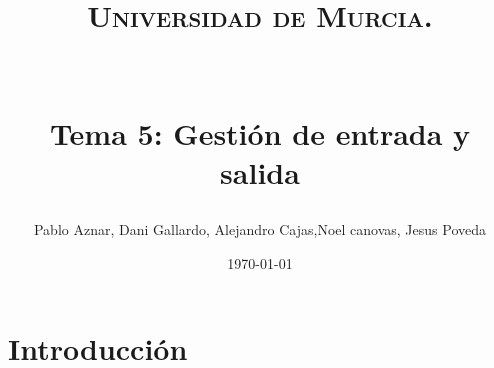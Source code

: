 \documentclass[paper=a4, fontsize=11pt, spanish]{scrartcl}
\title{
  \normalfont \normalsize 

  \textsc{Universidad de Murcia.} \\ [25pt] %
    
  \textbf{ \LARGE } \\ [25pt]
  
  \horrule{0.5pt} \\[0.4cm] %
  
  \huge Tema 5: Gestión de entrada y salida  
  \horrule{2pt} \\[0.5cm] %
}
\author{Pablo Aznar, Dani Gallardo, Alejandro Cajas,Noel canovas, Jesus Poveda} %
\date{\normalsize\today} %
\numberwithin{equation}{section} %
\numberwithin{figure}{section} %
\numberwithin{table}{section} %
\begin{document}
\maketitle %

\newpage %
\tableofcontents
\newpage %

\section{Introducción}


\section{}
\section{}
\section{}
\section{}
\section{}
\end{document}
